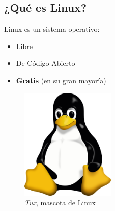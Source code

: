 \documentclass[aspectratio=43]{beamer}
\begin{document}
    \subsection{¿Qué es Linux?}
    \begin{frame}
        \begin{multicols}{2}
            Linux es un sistema operativo:
            \begin{itemize}
                \item Libre
                \item De Código Abierto
                \item \textbf{Gratis} (en su gran mayoría)
            \end{itemize}

            \newpage

            \begin{figure}[b]
                \includegraphics[width=0.4\textwidth]{img/tux.png}
                \caption*{\textit{Tux}, mascota de Linux}
            \end{figure}
        \end{multicols}
    \end{frame}

\end{document}
